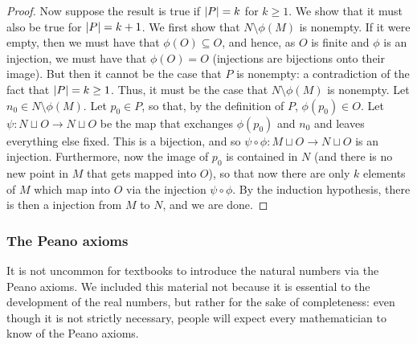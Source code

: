 \begin{prp}
\begin{proof}
Now suppose the result is true if $\lvert P\rvert=k$ for $k\geq 1$.  We show that it must also be true for $\lvert P\rvert=k+1$.  We first show that $N\setminus \phi (M)$ is nonempty.  If it were empty, then we must have that $\phi (O)\subseteq O$, and hence, as $O$ is finite and $\phi$ is an injection, we must have that $\phi (O)=O$ (injections are bijections onto their image).  But then it cannot be the case that $P$ is nonempty:  a contradiction of the fact that $\lvert P\rvert=k\geq 1$.  Thus, it must be the case that $N\setminus \phi (M)$ is nonempty.  Let $n_0\in N\setminus \phi (M)$.  Let $p_0\in P$, so that, by the definition of $P$, $\phi (p_0)\in O$.  Let $\psi :N\sqcup O\rightarrow N\sqcup O$ be the map that exchanges $\phi (p_0)$ and $n_0$ and leaves everything else fixed.  This is a bijection, and so $\psi \circ \phi :M\sqcup O\rightarrow N\sqcup O$ is an injection.  Furthermore, now the image of $p_0$ is contained in $N$ (and there is no new point in $M$ that gets mapped into $O$), so that now there are only $k$ elements of $M$ which map into $O$ via the injection $\psi \circ \phi$.  By the induction hypothesis, there is then a injection from $M$ to $N$, and we are done.
\end{proof}
\end{prp}

\subsubsection{The Peano axioms}

It is not uncommon for textbooks to introduce the natural numbers via the Peano axioms.  We included this material not because it is essential to the development of the real numbers, but rather for the sake of completeness:  even though it is not strictly necessary, people will expect every mathematician to know of the Peano axioms.

